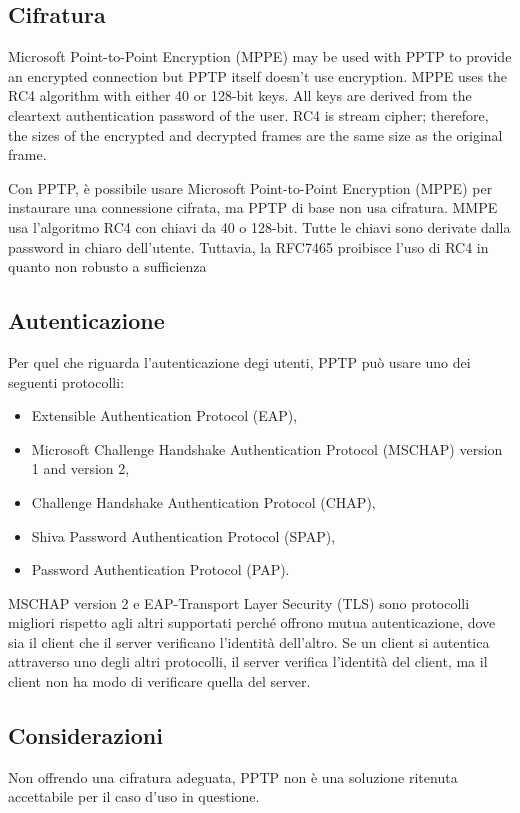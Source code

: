 \subsection{Cifratura}
Microsoft Point-to-Point Encryption (MPPE) may be used with PPTP to provide an encrypted connection but PPTP itself doesn't use encryption. MPPE uses the RC4 algorithm with either 40 or 128-bit keys. All keys are derived from the cleartext authentication password of the user. RC4 is stream cipher; therefore, the sizes of the encrypted and decrypted frames are the same size as the original frame.

Con PPTP, è possibile usare Microsoft Point-to-Point Encryption (MPPE) per instaurare una connessione cifrata, ma PPTP di base non usa cifratura. MMPE usa l'algoritmo RC4 con chiavi da 40 o 128-bit. Tutte le chiavi sono derivate dalla password in chiaro dell'utente. Tuttavia, la RFC7465 proibisce l'uso di RC4 in quanto non robusto a sufficienza

\subsection{Autenticazione}
Per quel che riguarda l'autenticazione degi utenti, PPTP può usare uno dei seguenti protocolli:
\begin{itemize}
    \item Extensible Authentication Protocol (EAP),
    \item Microsoft Challenge Handshake Authentication Protocol (MSCHAP) version 1 and version 2,
    \item Challenge Handshake Authentication Protocol (CHAP),
    \item Shiva Password Authentication Protocol (SPAP),
    \item Password Authentication Protocol (PAP).
\end{itemize}

MSCHAP version 2 e EAP-Transport Layer Security (TLS) sono protocolli migliori rispetto agli altri supportati perché offrono mutua autenticazione, dove sia il client che il server verificano l'identità dell'altro. Se un client si autentica attraverso uno degli altri protocolli, il server verifica l'identità del client, ma il client non ha modo di verificare quella del server.

\subsection{Considerazioni}
Non offrendo una cifratura adeguata, PPTP non è una soluzione ritenuta accettabile per il caso d'uso in questione.

